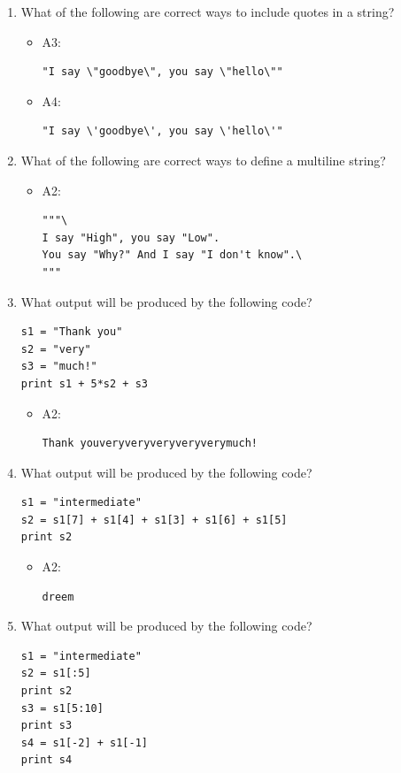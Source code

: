 \documentclass[article,A4,12pt]{llncs}
\begin{document}
\begin{enumerate}
\item What of the following are correct ways to include quotes in a string?
  \begin{itemize}
    \item A3:
\begin{verbatim}
"I say \"goodbye\", you say \"hello\""
\end{verbatim}
    \item A4:
\begin{verbatim}
"I say \'goodbye\', you say \'hello\'"
\end{verbatim}
  \end{itemize}
\item What of the following are correct ways to define a multiline string?
  \begin{itemize}
    \item A2:
\begin{verbatim}
"""\
I say "High", you say "Low".
You say "Why?" And I say "I don't know".\
"""
\end{verbatim}
  \end{itemize}
\item What output will be produced by the following code?
\begin{verbatim}
s1 = "Thank you"
s2 = "very"
s3 = "much!"
print s1 + 5*s2 + s3
\end{verbatim}
  \begin{itemize}
    \item A2:
\begin{verbatim}
Thank youveryveryveryveryverymuch!
\end{verbatim}
  \end{itemize}
\item What output will be produced by the following code?
\begin{verbatim}
s1 = "intermediate"
s2 = s1[7] + s1[4] + s1[3] + s1[6] + s1[5]
print s2
\end{verbatim}
  \begin{itemize}
    \item A2:
\begin{verbatim}
dreem
\end{verbatim}
  \end{itemize}
\item What output will be produced by the following code?
\begin{verbatim}
s1 = "intermediate"
s2 = s1[:5]
print s2
s3 = s1[5:10]
print s3
s4 = s1[-2] + s1[-1]
print s4
\end{verbatim}

\end{enumerate}
\end{document}
